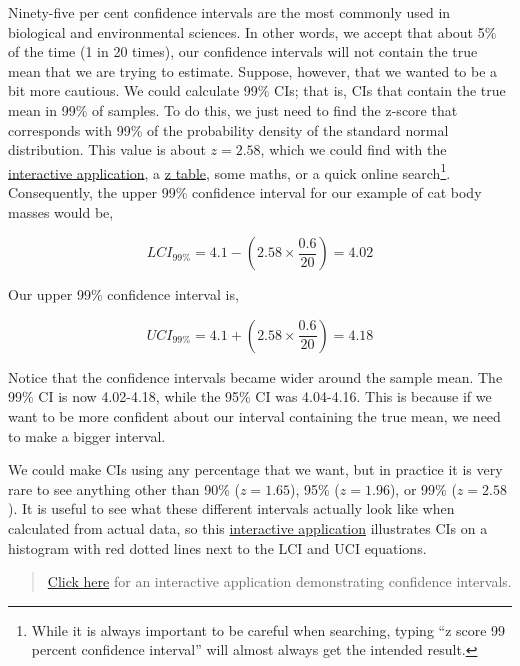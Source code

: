 \documentclass[
]{scrbook}
\begin{document}
Ninety-five per cent confidence intervals are the most commonly used in biological and environmental sciences.
In other words, we accept that about 5\% of the time (1 in 20 times), our confidence intervals will not contain the true mean that we are trying to estimate.
Suppose, however, that we wanted to be a bit more cautious.
We could calculate 99\% CIs; that is, CIs that contain the true mean in 99\% of samples.
To do this, we just need to find the z-score that corresponds with 99\% of the probability density of the standard normal distribution.
This value is about \(z = 2.58\), which we could find with the \href{https://bradduthie.shinyapps.io/zandp/}{interactive application}, a \href{https://www.z-table.com/}{z table}, some maths, or a quick online search\footnote{While it is always important to be careful when searching, typing ``z score 99 percent confidence interval'' will almost always get the intended result.}.
Consequently, the upper 99\% confidence interval for our example of cat body masses would be,

\[LCI_{99\%} = 4.1 - \left(2.58 \times \frac{0.6}{20}\right) = 4.02\]

Our upper 99\% confidence interval is,

\[UCI_{99\%} = 4.1 + \left(2.58 \times \frac{0.6}{20}\right) = 4.18\]

Notice that the confidence intervals became wider around the sample mean.
The 99\% CI is now 4.02-4.18, while the 95\% CI was 4.04-4.16.
This is because if we want to be more confident about our interval containing the true mean, we need to make a bigger interval.

We could make CIs using any percentage that we want, but in practice it is very rare to see anything other than 90\% (\(z = 1.65\)), 95\% (\(z = 1.96\)), or 99\% (\(z = 2.58\)).
It is useful to see what these different intervals actually look like when calculated from actual data, so this \href{https://bradduthie.shinyapps.io/CI_hist_app/}{interactive application} illustrates CIs on a histogram with red dotted lines next to the LCI and UCI equations.

\begin{quote}
\href{https://bradduthie.shinyapps.io/CI_hist_app/}{Click here} for an interactive application demonstrating confidence intervals.
\end{quote}
\end{document}

